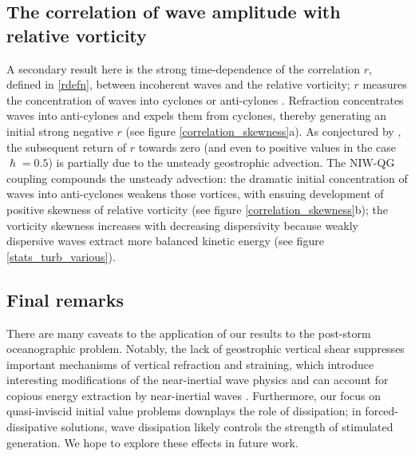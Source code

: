 \documentclass{jfm}
\begin{document}
\subsection{The correlation of wave amplitude with  relative vorticity}

A secondary result here
is the strong time-dependence of the correlation $r$, defined  in \eqref{rdefn}, between incoherent waves and
the relative vorticity; $r$ measures the concentration of waves into cyclones or
anti-cylones \citep{danioux_etal2015}. Refraction concentrates  waves into anti-cylones
and expels them from cyclones, thereby generating an initial  strong negative $r$ (see figure \ref{correlation_skewness}a).
As conjectured by \cite{danioux_etal2015}, the subsequent return of  $r$ towards zero (and even to positive values in the case $\hslash=0.5$)  is partially due to the unsteady
geostrophic advection. The NIW-QG coupling
compounds the unsteady advection: the dramatic initial concentration of
waves into anti-cyclones weakens those vortices, with ensuing development of positive
skewness of relative vorticity (see figure \ref{correlation_skewness}b); the vorticity skewness increases with decreasing
dispersivity because weakly dispersive waves extract more balanced kinetic energy
(see figure \ref{stats_turb_various}).



\subsection{Final remarks}

There are many caveats to the application of our
results to the  post-storm oceanographic problem. Notably, the lack of geostrophic
vertical shear suppresses important mechanisms of vertical refraction and
straining, which introduce interesting modifications of the near-inertial wave
physics \citep[e.g., ][]{thomas_2012} and can account for copious energy extraction by near-inertial waves \citep{shakespeare_hogg2017}.  Furthermore, our focus on quasi-inviscid initial value problems downplays the role of
dissipation; in forced-dissipative solutions, wave dissipation  likely controls
the strength of stimulated generation. We hope to explore these effects in future work.
\end{document}

